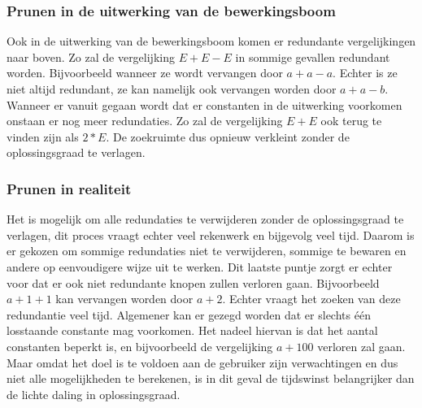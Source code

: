 \documentclass[Main.tex]{subfiles}
\begin{document}
\subsubsection*{Prunen in de uitwerking van de bewerkingsboom}
Ook in de uitwerking van de bewerkingsboom komen er redundante vergelijkingen naar boven. Zo zal de vergelijking $E+E-E$ in sommige gevallen redundant worden. Bijvoorbeeld wanneer ze wordt vervangen door $a+a-a$. Echter is ze niet altijd redundant, ze kan namelijk ook vervangen worden door $a+a-b$. Wanneer er vanuit gegaan wordt dat er constanten in de uitwerking voorkomen onstaan er nog meer redundaties. Zo zal de vergelijking $E+E$ ook terug te vinden zijn als $2*E$. De zoekruimte dus opnieuw verkleint zonder de oplossingsgraad te verlagen.
\subsubsection*{Prunen in realiteit}
Het is mogelijk om alle redundaties te verwijderen zonder de oplossingsgraad %
te verlagen, dit proces vraagt echter veel rekenwerk en bijgevolg veel tijd. Daarom is er gekozen om sommige redundaties niet te verwijderen, sommige te bewaren en andere op eenvoudigere wijze uit te werken. Dit laatste puntje zorgt er echter voor dat er ook niet redundante knopen zullen verloren gaan. Bijvoorbeeld $a+1+1$ kan vervangen worden door $a+2$. Echter vraagt het zoeken van deze redundantie veel tijd. Algemener kan er gezegd worden dat er slechts één losstaande constante mag voorkomen. Het nadeel hiervan is dat het aantal constanten beperkt is, en bijvoorbeeld de vergelijking $a+100$ verloren zal gaan. Maar omdat het doel is te voldoen aan de gebruiker zijn verwachtingen en dus niet alle mogelijkheden te berekenen, is in dit geval de tijdswinst belangrijker dan de lichte daling in oplossingsgraad. %
\end{document}
